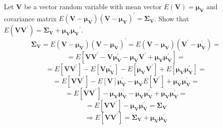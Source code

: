 Let $\textbf{V}$ be a vector random variable with mean vector $E(\textbf{V}) = \bm{\mu}_{\textbf{V}}$ and covariance matrix $E(\textbf{V}-\bm{\mu}_{\textbf{V}}){(\textbf{V}-\bm{\mu}_{\textbf{V}})}^{\prime} = \bm{\Sigma}_{\textbf{V}}$. Show that $E(\textbf{V}{\textbf{V}}^{\prime}) = \bm{\Sigma}_{\textbf{V}} + \bm{\mu}_{\textbf{V}}{\bm{\mu}_{\textbf{V}}}^{\prime}$.
\[
    \bm{\Sigma}_{\textbf{V}}
    =
    E(\textbf{V}-\bm{\mu}_{\textbf{V}}){(\textbf{V}-\bm{\mu}_{\textbf{V}})}^{\prime}
    =
    E(\textbf{V}-\bm{\mu}_{\textbf{V}})(\textbf{V}^{\prime}-\bm{\mu}_{\textbf{V}}^{\prime})
    =
\]
\[
    =
    E
    \left[
        \textbf{V}
        \textbf{V}^{\prime}
        -
        \textbf{V}
        \bm{\mu}_{\textbf{V}}^{\prime}
        -
        \bm{\mu}_{\textbf{V}}
        \textbf{V}^{\prime}
        +
        \bm{\mu}_{\textbf{V}}
        \bm{\mu}_{\textbf{V}}^{\prime}
    \right]
    =
\]
\[
    =
    E \left[
        \textbf{V}
        \textbf{V}^{\prime}
    \right]
    -
    E \left[
        \textbf{V}
        \bm{\mu}_{\textbf{V}}^{\prime}
    \right]
    -
    E \left[
        \bm{\mu}_{\textbf{V}}
        \textbf{V}^{\prime}
    \right]
    +
    E \left[
        \bm{\mu}_{\textbf{V}}
        \bm{\mu}_{\textbf{V}}^{\prime}
    \right]
    =
\]
\[
    =
    E \left[
        \textbf{V}
        \textbf{V}^{\prime}
    \right]
    -
    E \left[
        \textbf{V}
    \right]
    \bm{\mu}_{\textbf{V}}^{\prime}
    -
    \bm{\mu}_{\textbf{V}}
    E \left[
        \textbf{V}^{\prime}
    \right]
    +
    \bm{\mu}_{\textbf{V}}
    \bm{\mu}_{\textbf{V}}^{\prime}
    =
\]
\[
    =
    E \left[
        \textbf{V}
        \textbf{V}^{\prime}
    \right]
    -
    \bm{\mu}_{\textbf{V}}
    \bm{\mu}_{\textbf{V}}^{\prime}
    -
    \bm{\mu}_{\textbf{V}}
    \bm{\mu}_{\textbf{V}}^{\prime}
    +
    \bm{\mu}_{\textbf{V}}
    \bm{\mu}_{\textbf{V}}^{\prime}
    =
\]
\[
    =
    E \left[
        \textbf{V}
        \textbf{V}^{\prime}
    \right]
    -
    \bm{\mu}_{\textbf{V}}
    \bm{\mu}_{\textbf{V}}^{\prime}
    =
    \bm{\Sigma}_{\textbf{V}}
\]
\[
    \Rightarrow
    E \left[
        \textbf{V}
        \textbf{V}^{\prime}
    \right]
    =
    \bm{\Sigma}_{\textbf{V}}
    +
    \bm{\mu}_{\textbf{V}}
    \bm{\mu}_{\textbf{V}}^{\prime}
\]